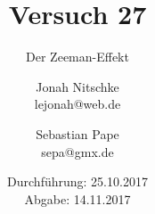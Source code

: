 

\title{Versuch 27}
\subtitle{Der Zeeman-Effekt}
\author{Jonah Nitschke\\
        lejonah@web.de \and
        Sebastian Pape\\
        sepa@gmx.de}
\date{Durchführung: 25.10.2017\\
      Abgabe: 14.11.2017}



\maketitle
\newpage
\setcounter{page}{1}


\newpage


\printbibliography


